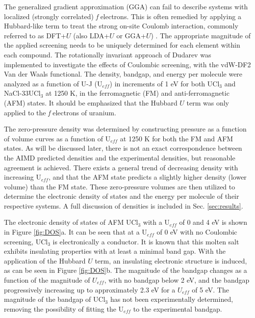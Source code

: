 \documentclass[preprint,3p,10pt,onecolumn,number,sort&compress]{elsarticle}
\begin{document}
{The generalized gradient approximation (GGA) can fail to describe systems with localized (strongly correlated) \textit{f} electrons. This is often remedied by applying a Hubbard-like term to treat the strong on-site Coulomb interaction, commonly referred to as DFT+$U$ (also LDA+$U$ or GGA+$U$) \cite{rohrbach2003}. The appropriate magnitude of the applied screening needs to be uniquely determined for each element within each compound. The rotationally invariant approach of Dudarev \cite{dudarev1998} was implemented to investigate the effects of Coulombic screening, with the vdW-DF2 Van der Waals functional. The density, bandgap, and energy per molecule were analyzed as a function of U-J (U$_{eff}$) in increments of 1 eV for both UCl$_3$ and NaCl-33UCl$_3$ at 1250 K, in the ferromagnetic (FM) and anti-ferromagnetic (AFM) states. It should be emphasized that the Hubbard $U$ term was only applied to the \textit{f} electrons of uranium. 

The zero-pressure density was determined by constructing pressure as a function of volume curves as a function of U$_{eff}$ at 1250 K for both the FM and AFM states. As will be discussed later, there is not an exact correspondence between the AIMD predicted densities and the experimental densities, but reasonable agreement is achieved. There exists a general trend of decreasing density with increasing U$_{eff}$, and that the AFM state predicts a slightly higher density (lower volume) than the FM state. These zero-pressure volumes are then utilized to determine the electronic density of states and the energy per molecule of their respective systems. A full discussion of densities is included in Sec. \ref{sec:results}. 

The electronic density of states of AFM UCl$_3$ with a U$_{eff}$ of 0 and 4 eV is shown in Figure \ref{fig:DOS}a. It can be seen that at a U$_{eff}$ of 0 eV with no Coulombic screening, UCl$_3$ is electronically a conductor. It is known that this molten salt exhibits insulating properties with at least a minimal band gap. With the application of the Hubbard $U$ term, an insulating electronic structure is induced, as can be seen in Figure \ref{fig:DOS}b. The magnitude of the bandgap changes as a function of the magnitude of $U_{eff}$, with no bandgap below 2 eV, and the bandgap progressively increasing up to approximately 2.3 eV for a $U_{eff}$ of 5 eV. The magnitude of the bandgap of UCl$_3$ has not been experimentally determined, removing the possibility of fitting the U$_{eff}$ to the experimental bandgap. 

}
\end{document}
